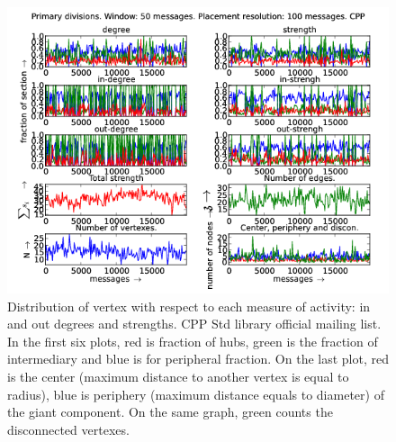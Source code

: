 \documentclass[%
 aip,
 jmp,%
 amsmath,amssymb,
 reprint,%
]{revtex4-1}
\begin{document}
\begin{figure}[hbtp] 
   \centering
        \includegraphics[width=\textwidth]{figs/CPP/50}
    \caption{Distribution of vertex with respect to each measure of activity: in and out degrees and strengths. CPP Std library official mailing list. In the first six plots, red is fraction of hubs, green is the fraction of intermediary and blue is for peripheral fraction. On the last plot, red is the center (maximum distance to another vertex is equal to radius), blue is periphery (maximum distance equals to diameter) of the giant component. On the same graph, green counts the disconnected vertexes.}
    \label{fig:cpp50}
\end{figure}
\end{document}
